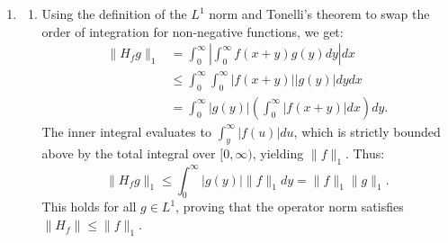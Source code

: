 \documentclass[10pt,a4paper]{article}
\begin{document}
\begin{enumerate}[label=\fbox{\arabic*}]
        We view $\log P_n$ as a Riemann sum for $\int_0^\infty h(x) dx$. We can bound the discretization error $E_n$:
        \[
          E_n = \left| \int_0^\infty h(x) dx - \frac{1}{n} \sum_{k=1}^\infty h\left(\frac{k}{n}\right) \right| \le \sum_{k=1}^\infty \int_{(k-1)/n}^{k/n} \left| h(x) - h\left(\frac{k}{n}\right) \right| dx.
        \]
        Because $h'(u)$ is bounded near $0$, there is a constant $C'$ such that $|h(u) - h(v)| \le C'|u - v|$ globally for the range of $f$. 
        For $x \in [\frac{k-1}{n}, \frac{k}{n}]$, the distance $|\frac{k}{n} - x| \le \frac{1}{n}$. Assuming $n \ge 1$, we have $\frac{k}{n} \in [x, x+1]$. Therefore, $|f(x) - f(k/n)| \le \sup_{y \in [x, x+1]} |f(y) - f(x)| = g(x)$.
        To show this bound forces the error to $0$, we define a tighter local supremum $g_\delta(x) = \sup_{y \in [x, x+\delta]} |f(y) - f(x)|$.
        The error is bounded precisely by $C' \int_0^\infty g_{1/n}(x) dx$.
        Since $f$ is uniformly continuous on compact sets and approaches 0, $g_\delta(x) \to 0$ pointwise as $\delta \to 0$. Moreover, $g_\delta(x) \le g(x)$ for $\delta \le 1$. Because $g(x)$ is integrable, Lebesgue's Dominated Convergence Theorem ensures that $\int_0^\infty g_{1/n}(x) dx \to 0$ as $n \to \infty$.
        Thus, $E_n \to 0$, and the limit of the sum is exactly the integral:
        \[
          \lim_{n \to \infty} \log P_n = \int_0^\infty \log(1 + f(x)) dx.
        \]
        Exponentiating back, the limit is:
        \[
          \exp\left( \int_0^\infty \log(1 + f(x)) dx \right).
        \]

  \item %
        \begin{enumerate}[label=(\arabic*)]
          \item Using the definition of the $L^1$ norm and Tonelli's theorem to swap the order of integration for non-negative functions, we get:
          \begin{align*}
            \|H_f g\|_1 &= \int_0^\infty \left| \int_0^\infty f(x+y) g(y) dy \right| dx \\
            &\le \int_0^\infty \int_0^\infty |f(x+y)| |g(y)| dy dx \\
            &= \int_0^\infty |g(y)| \left( \int_0^\infty |f(x+y)| dx \right) dy.
          \end{align*}
          The inner integral evaluates to $\int_y^\infty |f(u)| du$, which is strictly bounded above by the total integral over $[0, \infty)$, yielding $\|f\|_1$. Thus:
          \[
            \|H_f g\|_1 \le \int_0^\infty |g(y)| \|f\|_1 dy = \|f\|_1 \|g\|_1.
          \]
          This holds for all $g \in L^1$, proving that the operator norm satisfies $\|H_f\| \le \|f\|_1$.


\end{enumerate}
\end{enumerate}
\end{document}

